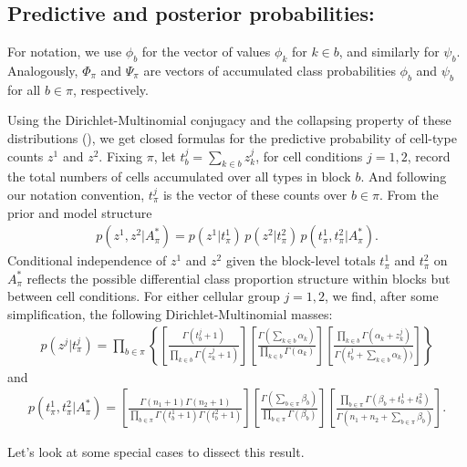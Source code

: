 \documentclass[11pt]{amsart}
\begin{document}
\subsection{Predictive and posterior probabilities:}
For notation, we use $\phi_b$ for the vector of values $\phi_k$ for $k \in b$,
and similarly for $\psi_b$. Analogously, $\Phi_\pi$ and $\Psi_\pi$
 are vectors of 
accumulated class probabilities $\phi_b$ and $\psi_b$ for all $b \in \pi$,
 respectively. 

Using the Dirichlet-Multinomial conjugacy and the collapsing property of
these distributions (\cite{ref:Dickey}), we get closed formulas for the predictive
probability of cell-type counts $z^1$ and $z^2$.  Fixing $\pi$,
let $t^j_b = \sum_{k\in b} z^j_k$, for cell conditions $j=1,2$, 
record the total numbers of cells accumulated over all types in block $b$.
And following our notation convention, $t^j_\pi$ is the vector of these
counts over $b \in \pi$.  From the prior and model structure
\begin{eqnarray*}
p(z^1,z^2|A^*_\pi) = p(z^1 | t^1_\pi)\, p(z^2|  t^2_\pi )
 \, p( t^1_\pi, t^2_\pi | A^*_\pi ).
\end{eqnarray*}
Conditional independence of $z^1$ and $z^2$ given the block-level totals
$t^1_\pi$ and $t^2_\pi$ on $A_\pi^*$ reflects the possible differential 
class proportion structure within blocks but between cell conditions.
For either cellular group $j=1,2$,
we find, after some simplification, the following Dirichlet-Multinomial masses: 
\begin{eqnarray*}
p(z^j|t^j_\pi) = \prod_{b \in \pi} \left\{
\left[ \frac{ \Gamma(t^j_b +1 ) }{\prod_{k \in b} \Gamma( z^j_k + 1 ) } 
\right]
\left[ \frac{\Gamma( \sum_{k \in b} \alpha_k )}{
		\prod_{k\in b} \Gamma( \alpha_k ) } \right] 
       \left[        \frac{ \prod_{k \in b} \Gamma(\alpha_k + z^j_k)  }{
		\Gamma(t^j_b + \sum_{k\in b} \alpha_k ) )}\right]
 \right\}
\end{eqnarray*}
and
\begin{eqnarray*}
p(t^1_\pi,t^2_\pi| A^*_\pi) =
 \left[ \frac{ \Gamma(n_1+1) \Gamma(n_2+1) }{ \prod_{b \in \pi} \Gamma(t^1_b+1) 
   \Gamma( t^2_b + 1 )} \right] 
\left[ \frac{\Gamma( \sum_{b \in \pi} \beta_b  )}{
   \prod_{b \in \pi} \Gamma(\beta_b )} \right] 
 \left[ \frac{ \prod_{b \in \pi} \Gamma( \beta_b + t^1_b + t^2_b )}{
	\Gamma( n_1 + n_2 + \sum_{b \in \pi} \beta_b  )} \right].
\end{eqnarray*}

Let's look at some special cases to dissect this result. 
\end{document}
